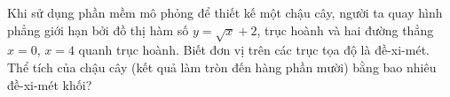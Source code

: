 \begin{bt}%
	Khi sử dụng phần mềm mô  phỏng để thiết kế một chậu cây, người ta quay hình phẳng giới hạn bởi đồ thị hàm số $y= \sqrt{x} + 2$, trục hoành và hai đường thẳng $x=0$, $x=4$ quanh trục hoành. Biết đơn vị trên các trục tọa độ là đề-xi-mét. Thể tích của chậu cây (kết quả làm tròn đến hàng phần mười) bằng bao nhiêu đề-xi-mét khối?
\end{bt}

